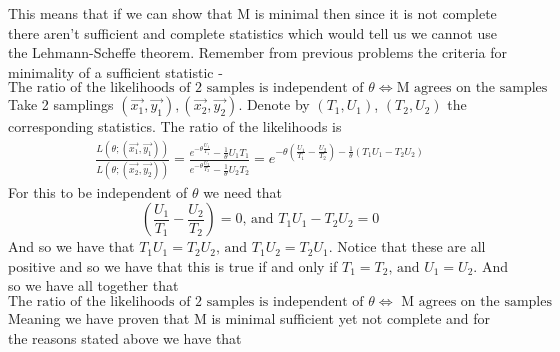\documentclass[../main.tex]{subfiles}
\begin{document}
\begin{enumerate}
    This means that if we can show that M is minimal then since it is not complete there aren't sufficient and complete statistics which would tell us we cannot use the Lehmann-Scheffe theorem. Remember from previous problems the criteria for minimality of a sufficient statistic - 
    \[\text{The ratio of the likelihoods of 2 samples is independent of }\theta\Longleftrightarrow\text{M agrees on the samples}\]
    Take 2 samplings $(\overrightarrow{x_1},\overrightarrow{y_1}), (\overrightarrow{x_2},\overrightarrow{y_2})$. Denote by $(T_1,U_1)$, $(T_2,U_2)$ the corresponding statistics. The ratio of the likelihoods is
    \begin{align*}\frac{L(\theta;(\overrightarrow{x_1},\overrightarrow{y_1}))}{L(\theta;(\overrightarrow{x_2},\overrightarrow{y_2}))} = \frac{e^{-\theta\frac{U_1}{T_1}}-\frac{1}{\theta}U_1T_1}{e^{-\theta\frac{U_2}{T_2}}-\frac{1}{\theta}U_2T_2} = e^{-\theta\left(\frac{U_1}{T_1}-\frac{U_2}{T_2}\right)-\frac{1}{\theta}\left(T_1U_1-T_2U_2\right)}\end{align*}
    For this to be independent of $\theta$ we need that 
    \[\left(\frac{U_1}{T_1}-\frac{U_2}{T_2}\right) = 0\text{, and }T_1U_1-T_2U_2 = 0\]
    And so we have that $T_1U_1 = T_2U_2\text{, and }T_1U_2=T_2U_1$. Notice that these are all positive and so we have that this is true if and only if $T_1=T_2\text{, and } U_1=U_2$. And so we have all together that 
    \[\text{The ratio of the likelihoods of 2 samples is independent of }\theta\Longleftrightarrow\text{ M agrees on the samples}\]
    Meaning we have proven that M is minimal sufficient yet not complete and for the reasons stated above we have that  \qedsymbol
    

\end{enumerate}
\end{document}
